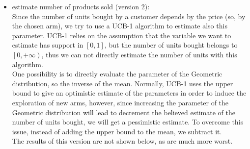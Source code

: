 \begin{itemize}
    \item estimate number of products sold (version 2):\\
    Since the number of units bought by a customer depends by the price (so, by the chosen arm), we try to use a UCB-1 algorithm to estimate also this parameter. UCB-1 relies on the assumption that the variable we want to estimate has support in $\left[0, 1 \right]$, but the number of units bought belongs to $\left[0, +\infty \right)$, thus we can not directly estimate the number of units with this algorithm.\\
    One possibility is to directly evaluate the parameter of the Geometric distribution, so the inverse of the mean. Normally, UCB-1 uses the upper bound to give an optimistic estimate of the parameters in order to induce the exploration of new arms, however, since increasing the parameter of the Geometric distribution will lead to decrement the believed estimate of the number of units bought, we will get a pessimistic estimate. To overcome this issue, instead of adding the upper bound to the mean, we subtract it.\\
 The results of this version are not shown below, as are much more worst.
\end{itemize}
